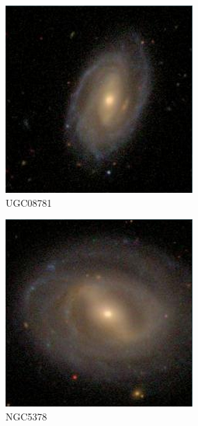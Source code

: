 \documentclass[9pt]{revtex4-1}
\begin{document}
\begin{figure}
\includegraphics[scale=0.3]{UGC08781.png}
\caption{UGC08781}
\end{figure}
\begin{figure}
\includegraphics[scale=0.3]{NGC5378.png}
\caption{NGC5378}
\end{figure}

\end{document}
